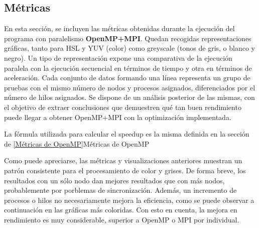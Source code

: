 \subsection{Métricas}
En esta sección, se incluyen las métricas obtenidas durante la ejecución del programa con paralelismo \textbf{OpenMP+MPI}. 
Quedan recogidas representaciones gráficas, tanto para HSL y YUV (color) como greyscale (tonos de gris, o blanco y negro).
Un tipo de representación expone una comparativa de la ejecución paralela con la ejecución secuencial en términos de tiempo y otra en términos de aceleración. 
Cada conjunto de datos formando una línea representa un grupo de pruebas con el mismo número de nodos y procesos asignados, diferenciados por el número de hilos asignados.
Se dispone de un análisis posterior de las mismas, con el objetivo de extraer conclusiones que demuestren qué tan buen rendimiento puede llegar a obtener OpenMP+MPI con la optimización implementada.

La fórmula utilizada para calcular el speedup es la misma definida en la sección de \ref{Métricas de OpenMP}{Métricas de OpenMP}



\newpage
{}

Como puede apreciarse, las métricas y visualizaciones anteriores muestran un patrón consistente para el procesamiento de color y grises. 
De forma breve, los resultados con un sólo nodo dan mejores resultados que con más nodos, probablemente por porblemas de sincronización. 
Además, un incremento de procesos o hilos no necesariamente mejora la eficiencia, como se puede observar a continuación en las gráficas más coloridas. 
Con esto en cuenta, la mejora en rendimiento es muy considerable, superior a OpenMP o MPI por individual.



\newpage